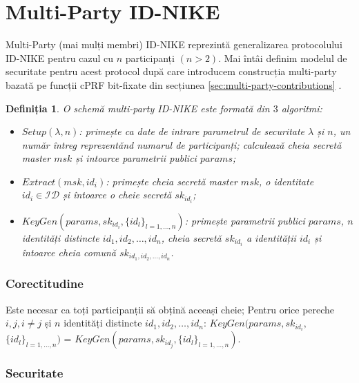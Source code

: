 \documentclass[oneside, 12pt]{book}
\newtheorem{definitie}{\textbf{Definiția}}[section]
\begin{document}
\section{Multi-Party ID-NIKE}
\label{subsec:multi-party-id}

Multi-Party (mai mulți membri) ID-NIKE reprezintă generalizarea protocolului ID-NIKE pentru cazul cu $n$ participanți $(n > 2)$. Mai întâi definim modelul de securitate pentru acest protocol după care introducem construcția multi-party bazată pe funcții cPRF bit-fixate din secțiunea \ref{sec:multi-party-contributions} \cite{RD:2014}.
\mbox{}\\
\begin{definitie}
	O schemă multi-party ID-NIKE este formată din $3$ algoritmi:
	\begin{itemize}
		\item $Setup(\lambda, n)$: primește ca date de intrare parametrul de securitate $\lambda$ și $n$, un număr întreg reprezentănd numarul de participanți; calculează cheia secretă master $msk$ și intoarce parametrii publici $params$;
		\item $Extract(msk, id_i)$: primește cheia secretă master $msk$, o identitate $id_i \in \mathcal{ID}$ și întoarce o cheie secretă $sk_{id_i}$;
		\item $KeyGen(params, sk_{id_i}, \{id_l\}_{l=1,\dots,n})$: primește parametrii publici $params$, $n$ identități distincte $id_1, id_2, \dots, id_n$, cheia secretă $sk_{id_i}$ a identității $id_i$ și întoarce cheia comună $sk_{id_1, id_2, \dots, id_n}$.
	\end{itemize}
\end{definitie}

\subsubsection{Corectitudine}
Este necesar ca toți participanții să obțină aceeași cheie; Pentru orice pereche $i, j, i \neq j$ și $n$ identități distincte $id_1, id_2, \dots, id_n$: $KeyGen(params, sk_{id_i}, $ $\{id_l\}_{l=1,\dots,n})$ = $KeyGen(params, sk_{id_j}, \{id_l\}_{l=1,\dots,n})$.



\subsubsection{Securitate}
\end{document}

